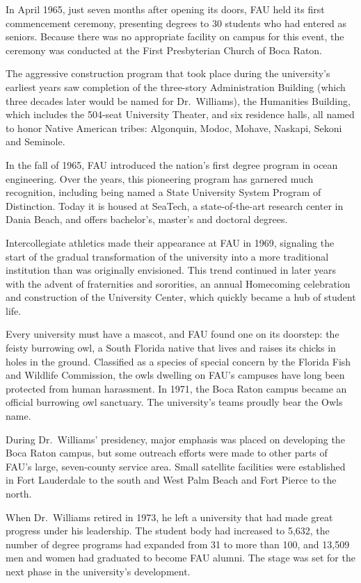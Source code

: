 \documentclass{article}
\begin{document}
In April 1965, just seven months after opening its doors, FAU held its first commencement ceremony, presenting degrees to 30 students who had entered as seniors.  Because there was no appropriate facility on campus for this event, the ceremony was conducted at the First Presbyterian Church of Boca Raton.

The aggressive construction program that took place during the university's earliest years saw completion of the three-story Administration Building (which three decades later would be named for Dr.\ Williams), the Humanities Building, which includes the 504-seat University Theater, and six residence halls, all named to honor Native American tribes: Algonquin, Modoc, Mohave, Naskapi, Sekoni and Seminole.

In the fall of 1965, FAU introduced the nation's first degree program in ocean engineering.  Over the years, this pioneering program has garnered much recognition, including being named a State University System Program of Distinction.  Today it is housed at SeaTech, a state-of-the-art research center in Dania Beach, and offers bachelor's, master's and doctoral degrees.

Intercollegiate athletics made their appearance at FAU in 1969, signaling the start of the gradual transformation of the university into a more traditional institution than was originally envisioned.  This trend continued in later years with the advent of fraternities and sororities, an annual Homecoming celebration and construction of the University Center, which quickly became a hub of student life.

Every university must have a mascot, and FAU found one on its doorstep: the feisty burrowing owl, a South Florida native that lives and raises its chicks in holes in the ground.  Classified as a species of special concern by the Florida Fish and Wildlife Commission, the owls dwelling on FAU's campuses have long been protected from human harassment.  In 1971, the Boca Raton campus became an official burrowing owl sanctuary.  The university's teams proudly bear the Owls name.

During Dr.\ Williams' presidency, major emphasis was placed on developing the Boca Raton campus, but some outreach efforts were made to other parts of FAU's large, seven-county service area.  Small satellite facilities were established in Fort Lauderdale to the south and West Palm Beach and Fort Pierce to the north.

When Dr.\ Williams retired in 1973, he left a university that had made great progress under his leadership. The student body had increased to 5,632, the number of degree programs had expanded from 31 to more than 100, and 13,509 men and women had graduated to become FAU alumni.  The stage was set for the next phase in the university's development.
\end{document}
